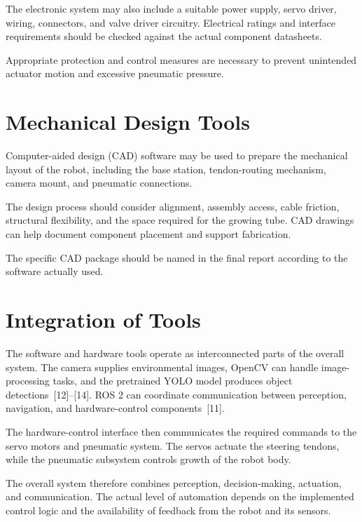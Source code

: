 The electronic system may also include a suitable power supply, servo driver, wiring, connectors, and valve driver circuitry. Electrical ratings and interface requirements should be checked against the actual component datasheets.

Appropriate protection and control measures are necessary to prevent unintended actuator motion and excessive pneumatic pressure.

\section{Mechanical Design Tools}

Computer-aided design (CAD) software may be used to prepare the mechanical layout of the robot, including the base station, tendon-routing mechanism, camera mount, and pneumatic connections.

The design process should consider alignment, assembly access, cable friction, structural flexibility, and the space required for the growing tube. CAD drawings can help document component placement and support fabrication.

The specific CAD package should be named in the final report according to the software actually used.

\section{Integration of Tools}

The software and hardware tools operate as interconnected parts of the overall system. The camera supplies environmental images, OpenCV can handle image-processing tasks, and the pretrained YOLO model produces object detections~[12]--[14]. ROS 2 can coordinate communication between perception, navigation, and hardware-control components~[11].

The hardware-control interface then communicates the required commands to the servo motors and pneumatic system. The servos actuate the steering tendons, while the pneumatic subsystem controls growth of the robot body.

The overall system therefore combines perception, decision-making, actuation, and communication. The actual level of automation depends on the implemented control logic and the availability of feedback from the robot and its sensors.